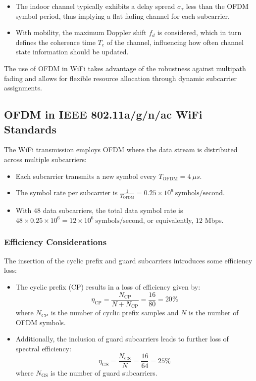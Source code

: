 \begin{itemize}
    \item The indoor channel typically exhibits a delay spread \( \sigma_\tau \) less than the OFDM symbol period, thus implying a flat fading channel for each subcarrier.
    \item With mobility, the maximum Doppler shift \( f_d \) is considered, which in turn defines the coherence time \( T_c \) of the channel, influencing how often channel state information should be updated.
\end{itemize}

The use of OFDM in WiFi takes advantage of the robustness against multipath fading and allows for flexible resource allocation through dynamic subcarrier assignments.



\subsection*{OFDM in IEEE 802.11a/g/n/ac WiFi Standards}

The WiFi transmission employs OFDM where the data stream is distributed across multiple subcarriers:

\begin{itemize}
    \item Each subcarrier transmits a new symbol every $T_{\text{OFDM}} = 4 \ \mu s$.
    \item The symbol rate per subcarrier is $\frac{1}{T_{\text{OFDM}}} = 0.25 \times 10^6 \ \text{symbols/second}$.
    \item With $48$ data subcarriers, the total data symbol rate is $48 \times 0.25 \times 10^6 = 12 \times 10^6 \ \text{symbols/second}$, or equivalently, $12$ Mbps.
\end{itemize}

\subsubsection*{Efficiency Considerations}

The insertion of the cyclic prefix and guard subcarriers introduces some efficiency loss:

\begin{itemize}
    \item The cyclic prefix (CP) results in a loss of efficiency given by:
    \[
    \eta_{\text{CP}} = \frac{N_{\text{CP}}}{N + N_{\text{CP}}} = \frac{16}{80} = 20\%
    \]
    where $N_{\text{CP}}$ is the number of cyclic prefix samples and $N$ is the number of OFDM symbols.

    \item Additionally, the inclusion of guard subcarriers leads to further loss of spectral efficiency:
    \[
    \eta_{\text{GS}} = \frac{N_{\text{GS}}}{N} = \frac{16}{64} = 25\%
    \]
    where $N_{\text{GS}}$ is the number of guard subcarriers.
\end{itemize}


